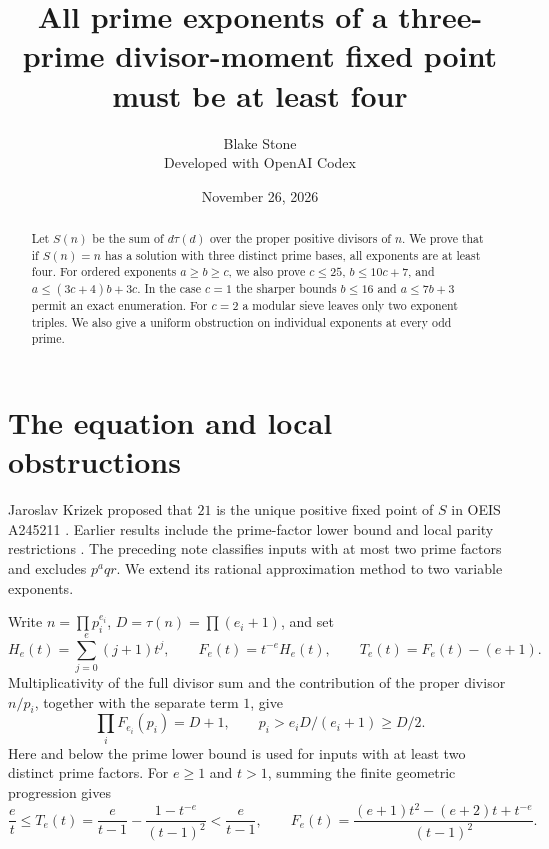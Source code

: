 \documentclass[11pt]{article}
\title{All prime exponents of a three-prime divisor-moment fixed point must be at least four}
\author{Blake Stone\\\small Developed with OpenAI Codex}
\date{November 26, 2026}
\begin{document}
\maketitle
\begin{abstract}
Let $S(n)$ be the sum of $d\tau(d)$ over the proper positive divisors of $n$.
We prove that if $S(n)=n$ has a solution with three distinct prime bases, all exponents are at least four. For ordered exponents $a\ge b\ge c$, we also prove $c\le25$, $b\le10c+7$, and $a\le(3c+4)b+3c$. In the case $c=1$ the sharper bounds $b\le16$ and $a\le7b+3$ permit an exact enumeration. For $c=2$ a modular sieve leaves only two exponent triples. We also give a uniform obstruction on
individual exponents at every odd prime.
\end{abstract}

\section{The equation and local obstructions}
Jaroslav Krizek proposed that $21$ is the unique positive fixed point of
$S$ in OEIS A245211 \cite{source}. Earlier results include the
prime-factor lower bound and local parity restrictions \cite{earlier,sugui}.
The preceding note \cite{companion} classifies inputs with at most two
prime factors and excludes $p^a q r$. We extend its rational
approximation method to two variable exponents.

Write $n=\prod p_i^{e_i}$, $D=\tau(n)=\prod(e_i+1)$, and set
\[
 H_e(t)=\sum_{j=0}^e(j+1)t^j,\qquad F_e(t)=t^{-e}H_e(t),\qquad
 T_e(t)=F_e(t)-(e+1).
\]
Multiplicativity of the full divisor sum and the contribution of the
proper divisor $n/p_i$, together with the separate term $1$, give
\begin{equation}
 \prod_i F_{e_i}(p_i)=D+1,\qquad
 p_i>e_iD/(e_i+1)\ge D/2.\label{eq:main}
\end{equation}
Here and below the prime lower bound is used for inputs with at least two
distinct prime factors. For $e\ge1$ and $t>1$, summing the finite
geometric progression gives
\begin{equation}
 \frac{e}{t}\le T_e(t)=\frac{e}{t-1}-\frac{1-t^{-e}}{(t-1)^2}
 <\frac{e}{t-1},\qquad
 F_e(t)=\frac{(e+1)t^2-(e+2)t+t^{-e}}{(t-1)^2}.\label{eq:tail}
\end{equation}
\end{document}
